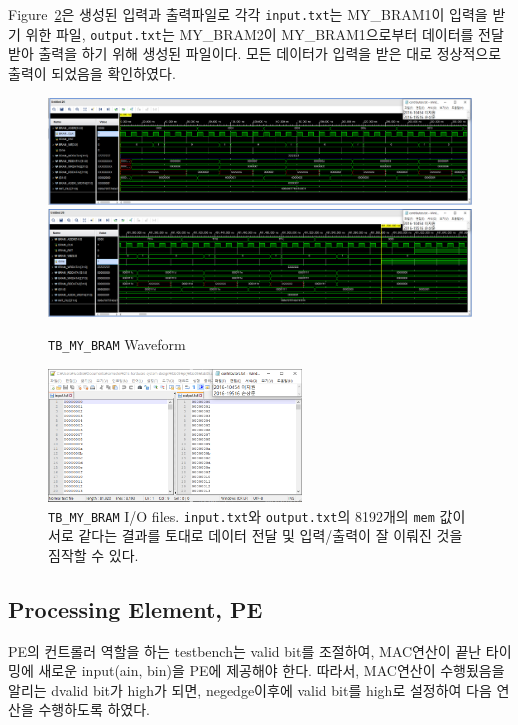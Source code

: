 \documentclass{article}
\begin{document}
Figure~\ref{fig3}은 생성된 입력과 출력파일로 각각 \texttt{input.txt}는 MY\_BRAM1이 입력을 받기 위한 파일, \texttt{output.txt}는 MY\_BRAM2이 MY\_BRAM1으로부터 데이터를 전달받아 출력을 하기 위해 생성된 파일이다. 모든 데이터가 입력을 받은 대로 정상적으로 출력이 되었음을 확인하였다.
\begin{figure}[ht]
	\centering
	\includegraphics[width=1.0\textwidth]{../../submission/MY_BRAM/MY_BRAM_Waveform1.png}
	\includegraphics[width=1.0\textwidth]{../../submission/MY_BRAM/MY_BRAM_Waveform2.png}
\caption{\texttt{TB\_MY\_BRAM} Waveform}
\label{fig2}
\end{figure}
\begin{figure}[ht]
	\centering
	\includegraphics[width=0.6\textwidth]{../../submission/MY_BRAM/MY_BRAM_result.png}
\caption{\texttt{TB\_MY\_BRAM} I/O files. \texttt{input.txt}와 \texttt{output.txt}의 8192개의 \texttt{mem} 값이 서로 같다는 결과를 토대로 데이터 전달 및 입력/출력이 잘 이뤄진 것을 짐작할 수 있다.}
\label{fig3}
\end{figure}

\newpage
\subsection{Processing Element, PE}
PE의 컨트롤러 역할을 하는 testbench는 valid bit를 조절하여, MAC연산이 끝난 타이밍에 새로운 input(ain, bin)을 PE에 제공해야 한다. 따라서, MAC연산이 수행됬음을 알리는 dvalid bit가 high가 되면, negedge이후에 valid bit를 high로 설정하여 다음 연산을 수행하도록 하였다. \\
\end{document}
